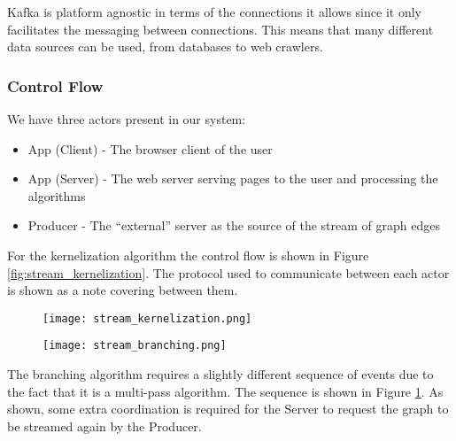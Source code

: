 Kafka is platform agnostic in terms of the connections it allows since it only
facilitates the messaging between connections. This means that many different
data sources can be used, from databases to web crawlers.

\subsubsection{Control Flow}

We have three actors present in our system:

\begin{itemize}
    \item
          App (Client) - The browser client of the user
    \item
          App (Server) - The web server serving pages to the user and
          processing the algorithms
    \item
          Producer - The ``external'' server as the source of the stream of
          graph edges
\end{itemize}

For the kernelization algorithm the control flow is shown in Figure
\ref{fig:stream_kernelization}. The protocol used to communicate between each
actor is shown as a note covering between them.

\begin{figure}[H]
    \centering
    \begin{minipage}{.5\textwidth}
        \centering
        \texttt{[image: stream\_kernelization.png]}
        \label{fig:stream_kernelization}
    \end{minipage}%
    \begin{minipage}{.5\textwidth}
        \centering
        \texttt{[image: stream\_branching.png]}
        \label{fig:stream_branching}
    \end{minipage}
\end{figure}

The branching algorithm requires a slightly different sequence of events due to
the fact that it is a multi-pass algorithm. The sequence is shown in Figure
\ref{fig:stream_branching}. As shown, some extra coordination is required for
the Server to request the graph to be streamed again by the Producer.
